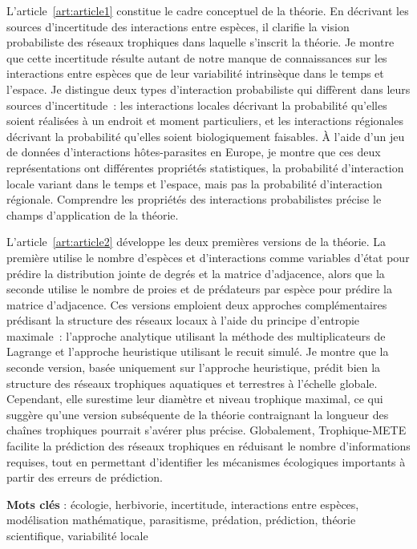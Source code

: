 \documentclass[12pt,twoside,phd]{dms}
\numberwithin{equation}{section}
\numberwithin{table}{chapter}
\numberwithin{figure}{chapter}
\begin{document}
L'article~\ref{art:article1} constitue le cadre conceptuel de la théorie. En
décrivant les sources d'incertitude des interactions entre espèces, il clarifie
la vision probabiliste des réseaux trophiques dans laquelle s'inscrit la
théorie. Je montre que cette incertitude résulte autant de notre manque de
connaissances sur les interactions entre espèces que de leur variabilité
intrinsèque dans le temps et l'espace. Je distingue deux types d'interaction
probabiliste qui diffèrent dans leurs sources d'incertitude~: les interactions
locales décrivant la probabilité qu'elles soient réalisées à un endroit et
moment particuliers, et les interactions régionales décrivant la probabilité
qu'elles soient biologiquement faisables. À l'aide d'un jeu de données
d'interactions hôtes-parasites en Europe, je montre que ces deux représentations
ont différentes propriétés statistiques, la probabilité d'interaction locale
variant dans le temps et l'espace, mais pas la probabilité d'interaction
régionale. Comprendre les propriétés des interactions probabilistes précise le
champs d'application de la théorie.

L'article~\ref{art:article2} développe les deux premières versions de la
théorie. La première utilise le nombre d'espèces et d'interactions comme
variables d'état pour prédire la distribution jointe de degrés et la matrice
d'adjacence, alors que la seconde utilise le nombre de proies et de prédateurs
par espèce pour prédire la matrice d'adjacence. Ces versions emploient deux
approches complémentaires prédisant la structure des réseaux locaux à l'aide du
principe d'entropie maximale~: l'approche analytique utilisant la méthode des
multiplicateurs de Lagrange et l'approche heuristique utilisant le recuit
simulé. Je montre que la seconde version, basée uniquement sur l'approche
heuristique, prédit bien la structure des réseaux trophiques aquatiques et
terrestres à l'échelle globale. Cependant, elle surestime leur diamètre et
niveau trophique maximal, ce qui suggère qu'une version subséquente de la
théorie contraignant la longueur des chaînes trophiques pourrait s'avérer plus
précise. Globalement, Trophique-METE facilite la prédiction des réseaux
trophiques en réduisant le nombre d'informations requises, tout en permettant
d'identifier les mécanismes écologiques importants à partir des erreurs de
prédiction.

\textbf{Mots clés} : écologie, herbivorie, incertitude, interactions entre
espèces, modélisation mathématique, parasitisme, prédation, prédiction, théorie
scientifique, variabilité locale  
\end{document}
